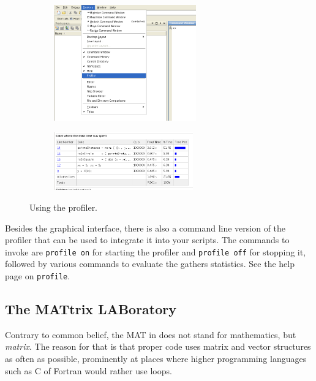 \begin{figure}
\centering
\begin{subfigure}[b]{0.45\textwidth}
  \includegraphics[height=5cm]{figures/matlab-open-profiler.png}
\end{subfigure}
\hfill
\begin{subfigure}[b]{0.45\textwidth}
  \includegraphics[width=6cm]{figures/matlab-profiler-circleBox-result.png}
\end{subfigure}
\caption{Using the profiler.}
\label{figure:profiler}
\end{figure}

\begin{remark}
Besides the graphical interface, there is also a command line version of the
profiler that can be used to integrate it into your scripts. The commands to
invoke are \lstinline!profile on! for starting the profiler and
\lstinline!profile off! for stopping it, followed by various commands to
evaluate the gathers statistics. See the \matlab{} help page on
\lstinline!profile!.
\end{remark}


\subsection{The MATtrix LABoratory}

Contrary to common belief, the MAT in \matlab{} does not stand for mathematics,
but \emph{matrix}. The reason for that is that proper \matlab{} code uses
matrix and vector structures as often as possible, prominently at places where
higher programming languages such as C of Fortran would rather use loops.


